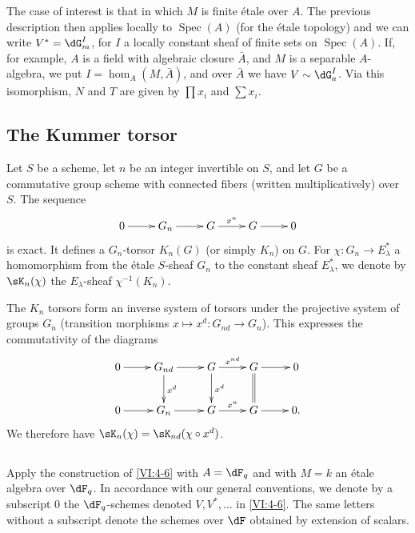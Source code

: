 \documentclass[oneside]{book}
\DeclareMathOperator{\spec}{Spec}
\theoremstyle{sga-source}
\theoremstyle{sga-source-dash}
\theoremstyle{sga-source-dotdash}
\theoremstyle{sga-source-number-note-dash}
\theoremstyle{sga-source-note-number-dotdash}
\theoremstyle{sga-source-example-dotdash}
\theoremstyle{sga-source-inline-number}
\theoremstyle{sga-source-bare-number}
\theoremstyle{sga-source}
\newcommand{\PrintPage}[1]{}\newcommand{\MathPage}[1]{}\newcommand{\PrintCite}[2]{#1}\newcommand{\var}[3]{#2}
\begin{document}
\PrintPage{199}
The case of interest is that in which $M$ is finite étale over $A$. The 
previous description then applies locally to $\spec(A)$ (for the 
étale topology) and we can write $V^\ast=\dG_m^I$, for $I$ a locally 
constant sheaf of finite sets on $\spec(A)$. If, for example, $A$ is a 
field with algebraic closure $\bar A$, and $M$ is a separable $A$-algebra, 
we put $I=\hom_A(M,\bar A)$, and over $\bar A$ we have 
$V\sim \dG_a^I$. Via this isomorphism, $N$ and $T$ are given by $\prod x_i$ and 
$\sum x_i$. 





\subsection{The Kummer torsor}\label{VI:4-7}

Let $S$ be a scheme, let $n$ be an integer invertible on $S$, and let $G$ be a 
commutative group scheme with connected fibers (written multiplicatively) over $S$. 
The sequence 
\[\xymatrix{
  0 \ar[r] 
    & G_n \ar[r] 
    & G \ar[r]^-{x^n} 
    & G \ar[r] 
    & 0 
}\]
is exact. It defines a $G_n$-torsor $K_n(G)$ (or simply $K_n$) on 
$G$. For $\chi:G_n \to E_\lambda^\ast$ a homomorphism from the étale 
$S$-sheaf $G_n$ to the constant sheaf $E_\lambda^\ast$, we denote by 
$\sK_n(\chi)$ the $E_\lambda$-sheaf $\chi^{-1}(K_n)$. 

The $K_n$ torsors form an inverse system of torsors under the 
projective system of groups $G_n$ (transition morphisms 
$x\mapsto x^d:G_{n d}\to G_n$). This expresses the commutativity of the diagrams 
\[\xymatrix{
  0 \ar[r] 
    & G_{n d} \ar[r] \ar[d]^-{x^d} 
    & G \ar[r]^-{x^{n d}} \ar[d]^-{x^d} 
    & G \ar[r] \ar@{=}[d] 
    & 0 \\
  0 \ar[r] 
    & G_n \ar[r] 
    & G \ar[r]^-{x^n} 
    & G \ar[r] 
    & 0 \text{.} 
}\]
We therefore have $\sK_n(\chi) = \sK_{n d}(\chi\circ x^d)$. 





\subsection{}\label{VI:4-8}

Apply the construction of \ref{VI:4-6} with $A=\dF_q$ and with $M=k$ an 
étale algebra over $\dF_q$. In accordance with our general conventions, we denote 
by a subscript $0$ the $\dF_q$-schemes denoted $V,V^\ast,\ldots$ in 
\ref{VI:4-6}. The same letters without a subscript denote the schemes over 
$\dF$ obtained by extension of scalars. 
\end{document}
